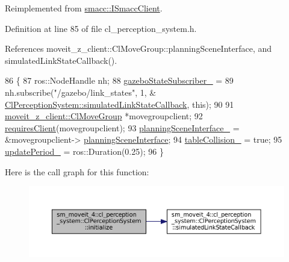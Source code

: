 Reimplemented from \hyperlink{classsmacc_1_1ISmaccClient_a974ebb6ad6cf812e7b9de6b78b3d901f}{smacc\+::\+I\+Smacc\+Client}.



Definition at line 85 of file cl\+\_\+perception\+\_\+system.\+h.



References moveit\+\_\+z\+\_\+client\+::\+Cl\+Move\+Group\+::planning\+Scene\+Interface, and simulated\+Link\+State\+Callback().


\begin{DoxyCode}
86             \{
87                 ros::NodeHandle nh;
88                 \hyperlink{classsm__moveit__4_1_1cl__perception__system_1_1ClPerceptionSystem_af937d51058c115f6a7f39df9c1df6650}{gazeboStateSubscriber\_} =
89                     nh.subscribe(\textcolor{stringliteral}{"/gazebo/link\_states"}, 1, &
      \hyperlink{classsm__moveit__4_1_1cl__perception__system_1_1ClPerceptionSystem_a345284941e550bc24c90001351a25087}{ClPerceptionSystem::simulatedLinkStateCallback}, \textcolor{keyword}{this});
90 
91                 \hyperlink{classmoveit__z__client_1_1ClMoveGroup}{moveit\_z\_client::ClMoveGroup} *movegroupclient;
92                 \hyperlink{classsmacc_1_1ISmaccClient_a7a9990a2f3e35d547671188d69fee520}{requiresClient}(movegroupclient);
93                 \hyperlink{classsm__moveit__4_1_1cl__perception__system_1_1ClPerceptionSystem_a7b0311554dc2efc15db1999adea877cb}{planningSceneInterface\_} = &movegroupclient->
      \hyperlink{classmoveit__z__client_1_1ClMoveGroup_a21c879b2683286aa21ce68f40195b4b5}{planningSceneInterface};
94                 \hyperlink{classsm__moveit__4_1_1cl__perception__system_1_1ClPerceptionSystem_ab8cc53236e3a3dfaa05ab35c843a6563}{tableCollision\_} = \textcolor{keyword}{true};
95                 \hyperlink{classsm__moveit__4_1_1cl__perception__system_1_1ClPerceptionSystem_a0cd8e545b3a0744f6e6c235d9e47d740}{updatePeriod\_} = ros::Duration(0.25);
96             \}
\end{DoxyCode}
Here is the call graph for this function\+:
\nopagebreak
\begin{figure}[H]
\begin{center}
\leavevmode
\includegraphics[width=350pt]{classsm__moveit__4_1_1cl__perception__system_1_1ClPerceptionSystem_a26ae80fff022baeccb4ca81537cefd53_cgraph}
\end{center}
\end{figure}
